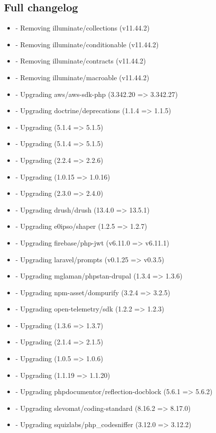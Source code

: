     \subsection{Full changelog}\label{subsec:full-changelog}
    \begin{itemize}
        \item - Removing illuminate/collections (v11.44.2)
        \item - Removing illuminate/conditionable (v11.44.2)
        \item - Removing illuminate/contracts (v11.44.2)
        \item - Removing illuminate/macroable (v11.44.2)
        \item - Upgrading aws/aws-sdk-php (3.342.20 => 3.342.27)
        \item - Upgrading doctrine/deprecations (1.1.4 => 1.1.5)
        \item - Upgrading  (5.1.4 => 5.1.5)
        \item - Upgrading  (5.1.4 => 5.1.5)
        \item - Upgrading  (2.2.4 => 2.2.6)
        \item - Upgrading  (1.0.15 => 1.0.16)
        \item - Upgrading  (2.3.0 => 2.4.0)
        \item - Upgrading drush/drush (13.4.0 => 13.5.1)
        \item - Upgrading e0ipso/shaper (1.2.5 => 1.2.7)
        \item - Upgrading firebase/php-jwt (v6.11.0 => v6.11.1)
        \item - Upgrading laravel/prompts (v0.1.25 => v0.3.5)
        \item - Upgrading mglaman/phpstan-drupal (1.3.4 => 1.3.6)
        \item - Upgrading npm-asset/dompurify (3.2.4 => 3.2.5)
        \item - Upgrading open-telemetry/sdk (1.2.2 => 1.2.3)
        \item - Upgrading  (1.3.6 => 1.3.7)
        \item - Upgrading  (2.1.4 => 2.1.5)
        \item - Upgrading  (1.0.5 => 1.0.6)
        \item - Upgrading  (1.1.19 => 1.1.20)
        \item - Upgrading phpdocumentor/reflection-docblock (5.6.1 => 5.6.2)
        \item - Upgrading slevomat/coding-standard (8.16.2 => 8.17.0)
        \item - Upgrading squizlabs/php\_codesniffer (3.12.0 => 3.12.2)
    \end{itemize}

